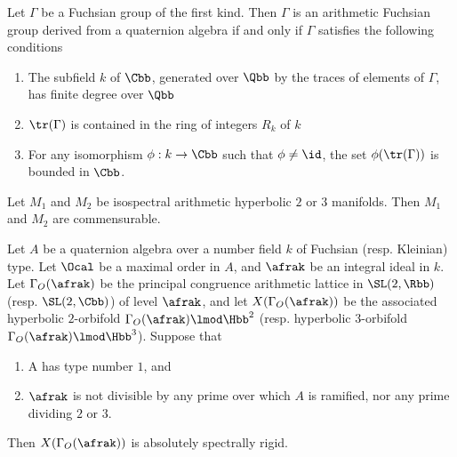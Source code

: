 \begin{thm}\label{thm:takeuchi}
  Let $\Gamma$ be a Fuchsian group of the first kind. Then $\Gamma$ is an arithmetic Fuchsian group derived from a quaternion algebra if and only if $\Gamma$ satisfies the following conditions
  \begin{enumerate}
    \item The subfield $k$ of $\Cbb$, generated over $\Qbb$ by the traces of elements of $\Gamma$, has finite degree over $\Qbb$
    \item $\tr(\Gamma)$ is contained in the ring of integers $R_{k}$ of $k$
    \item For any isomorphism $\phi: k \to \Cbb$ such that $\phi \neq \id$, the set $\phi(\tr(\Gamma))$ is bounded in $\Cbb$.
  \end{enumerate}
\end{thm}

\begin{thm}

  Let $M_1$ and $M_2$ be isospectral arithmetic hyperbolic $2$ or $3$ manifolds. Then $M_1$ and $M_2$ are commensurable.
\end{thm}



\begin{thm}
  Let $A$ be a quaternion algebra over a number field $k$ of Fuchsian (resp. Kleinian) type. Let $\Ocal$ be a maximal order in $A$, and $\afrak$ be an integral ideal in $k$.  Let $\Gamma_O(\afrak)$ be the principal congruence arithmetic lattice in $\SL(2,\Rbb)$ (resp. $\SL(2,\Cbb)$) of level $\afrak$, and let $X(\Gamma_O(\afrak))$ be the associated hyperbolic $2$-orbifold $\Gamma_O(\afrak) \lmod \Hbb^2$ (resp. hyperbolic $3$-orbifold $\Gamma_O(\afrak) \lmod \Hbb^3$). Suppose that
  \begin{enumerate}
    \item A has type number $1$, and
    \item $\afrak$ is not divisible by any prime over which  $A$ is ramified, nor any prime dividing $2$ or $3$.
  \end{enumerate}
  Then $X(\Gamma_O (\afrak))$ is absolutely spectrally rigid.
\end{thm}

